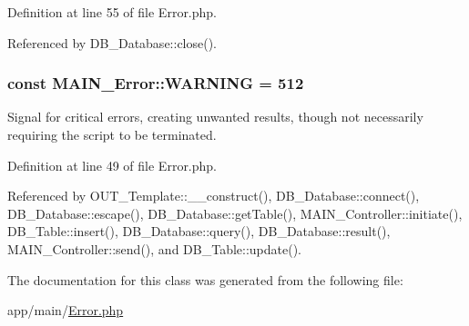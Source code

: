 Definition at line 55 of file Error.php.

Referenced by DB\_\-Database::close().\hypertarget{classMAIN__Error_af47cc28f788d73c277a78761621fd711}{
\subsubsection[{WARNING}]{\setlength{\rightskip}{0pt plus 5cm}const {\bf MAIN\_\-Error::WARNING} = 512}}
\label{d4/d5e/classMAIN__Error_af47cc28f788d73c277a78761621fd711}
Signal for critical errors, creating unwanted results, though not necessarily requiring the script to be terminated. 

Definition at line 49 of file Error.php.

Referenced by OUT\_\-Template::\_\-\_\-construct(), DB\_\-Database::connect(), DB\_\-Database::escape(), DB\_\-Database::getTable(), MAIN\_\-Controller::initiate(), DB\_\-Table::insert(), DB\_\-Database::query(), DB\_\-Database::result(), MAIN\_\-Controller::send(), and DB\_\-Table::update().

The documentation for this class was generated from the following file:\begin{DoxyCompactItemize}
\item 
app/main/\hyperlink{Error_8php}{Error.php}\end{DoxyCompactItemize}
